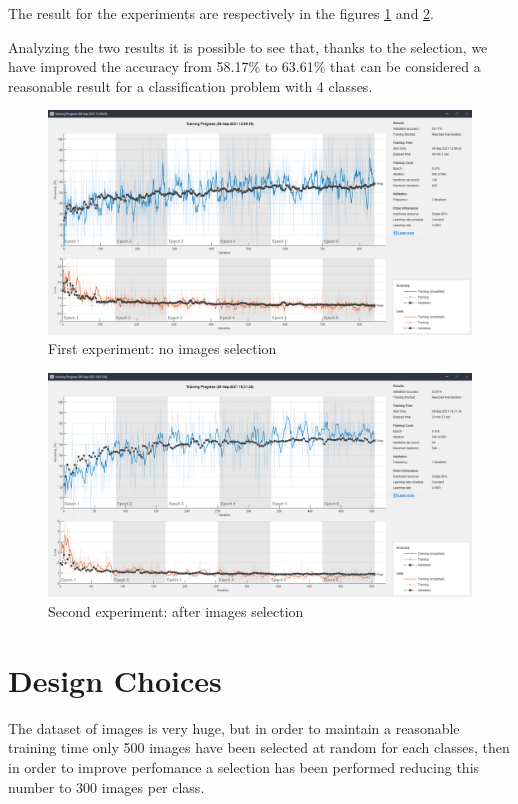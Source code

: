 \documentclass[a4paper]{report}
\begin{document}
	\noindent The result for the experiments are respectively in the figures \ref{img: trainingCnnFourClasses} and \ref{img: trainingCnnFourClassesAfterSelection}.
	
	\noindent Analyzing the two results it is possible to see that, thanks to the selection, we have improved the accuracy from 58.17\% to 63.61\% that can be considered a reasonable result for a classification problem with 4 classes.
	
	\begin{figure}[htbp]
		\centering
		\includegraphics[scale=0.31]{img/trainingCnnFourClasses.png}
		\caption{First experiment: no images selection}
		\label{img: trainingCnnFourClasses}
	\end{figure}
	
	\begin{figure}[htbp]
		\centering
		\includegraphics[scale=0.31]{img/trainingCnnFourClasses_afterSelection.png}
		\caption{Second experiment: after images selection}
		\label{img: trainingCnnFourClassesAfterSelection}
	\end{figure}
	

	
	\section{Design Choices}
	\noindent The dataset of images is very huge, but in order to maintain a reasonable training time only 500 images have been selected at random for each classes, then in order to improve perfomance a selection has been performed reducing this number to 300 images per class.
	
\end{document}
